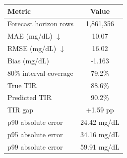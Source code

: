 \begin{tabular}{lc}
\toprule
Metric & Value \\
\midrule
Forecast horizon rows & 1,861,356 \\
MAE (mg/dL) $\downarrow$ & 10.07 \\
RMSE (mg/dL) $\downarrow$ & 16.02 \\
Bias (mg/dL) & -1.163 \\
80\% interval coverage & 79.2\% \\
True TIR & 88.6\% \\
Predicted TIR & 90.2\% \\
TIR gap & +1.59 pp \\
p90 absolute error & 24.42 mg/dL \\
p95 absolute error & 34.16 mg/dL \\
p99 absolute error & 59.91 mg/dL \\
\bottomrule
\end{tabular}
